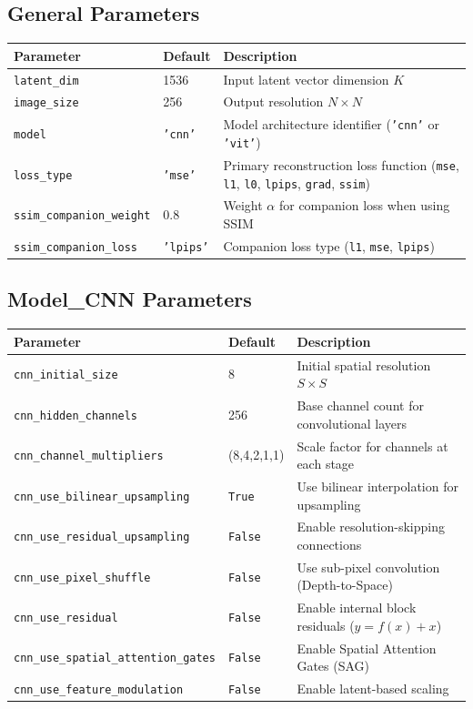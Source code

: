 \documentclass[11pt]{article}
\begin{document}
\subsection{General Parameters}
\begin{center}
\begin{tabular}{lll}
\toprule
\textbf{Parameter} & \textbf{Default} & \textbf{Description} \\
\midrule
\texttt{latent\_dim} & 1536 & Input latent vector dimension $K$ \\
\texttt{image\_size} & 256 & Output resolution $N \times N$ \\
\texttt{model} & \texttt{'cnn'} & Model architecture identifier (\texttt{'cnn'} or \texttt{'vit'}) \\
\texttt{loss\_type} & \texttt{'mse'} & Primary reconstruction loss function (\texttt{mse}, \texttt{l1}, \texttt{l0}, \texttt{lpips}, \texttt{grad}, \texttt{ssim}) \\
\texttt{ssim\_companion\_weight} & 0.8 & Weight $\alpha$ for companion loss when using SSIM \\
\texttt{ssim\_companion\_loss} & \texttt{'lpips'} & Companion loss type (\texttt{l1}, \texttt{mse}, \texttt{lpips}) \\
\bottomrule
\end{tabular}
\end{center}

\subsection{Model\_CNN Parameters}
\begin{center}
\begin{tabular}{lll}
\toprule
\textbf{Parameter} & \textbf{Default} & \textbf{Description} \\
\midrule
\texttt{cnn\_initial\_size} & 8 & Initial spatial resolution $S \times S$ \\
\texttt{cnn\_hidden\_channels} & 256 & Base channel count for convolutional layers \\
\texttt{cnn\_channel\_multipliers} & (8,4,2,1,1) & Scale factor for channels at each stage \\
\texttt{cnn\_use\_bilinear\_upsampling} & \texttt{True} & Use bilinear interpolation for upsampling \\
\texttt{cnn\_use\_residual\_upsampling} & \texttt{False} & Enable resolution-skipping connections \\
\texttt{cnn\_use\_pixel\_shuffle} & \texttt{False} & Use sub-pixel convolution (Depth-to-Space) \\
\texttt{cnn\_use\_residual} & \texttt{False} & Enable internal block residuals ($y = f(x) + x$) \\
\texttt{cnn\_use\_spatial\_attention\_gates} & \texttt{False} & Enable Spatial Attention Gates (SAG) \\
\texttt{cnn\_use\_feature\_modulation} & \texttt{False} & Enable latent-based scaling \\
\bottomrule
\end{tabular}
\end{center}
\end{document}
